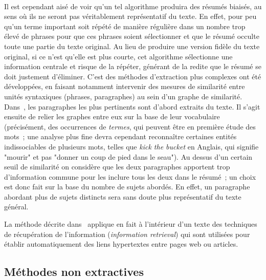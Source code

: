 \documentclass[a4paper, 12pt]{article}
\begin{document}
\paragraph{}
Il est cependant aisé de voir qu'un tel algorithme produira des résumés biaisés, au sens où ils ne seront pas véritablement représentatif du texte. En effet, pour peu qu'un terme important soit répété de manière régulière dans un nombre trop élevé de phrases pour que ces phrases soient sélectionner et que le résumé occulte toute une partie du texte original. Au lieu de produire une version fidèle du texte original, si ce n'est qu'elle est plus courte, cet algorithme sélectionne une information centrale et risque de la répéter, générant de la redite que le résumé se doit justement d'éliminer. C'est des méthodes d'extraction plus complexes ont été développées, en faisant notamment intervenir des mesures de similarité entre unités syntaxiques (phrases, paragraphes) au sein d'un graphe de similarité. Dans~\cite{salton_automatic_1997}, les paragraphes les plus pertinents sont d'abord extraits du texte. Il s'agit ensuite de relier les graphes entre eux sur la base de leur vocabulaire (précisément, des occurrences de \emph{termes}, qui peuvent être en première étude des mots~; une analyse plus fine devra cependant reconnaître certaines entités indissociables de plusieurs mots, telles que \textit{kick the bucket} en Anglais, qui signifie "mourir" et pas "donner un coup de pied dans le seau"). Au dessus d'un certain seuil de similarité on considère que les deux paragraphes apportent trop d'information commune pour les inclure tous les deux dans le résumé~; un choix est donc fait sur la base du nombre de sujets abordés. En effet, un paragraphe abordant plus de sujets distincts sera sans doute plus représentatif du texte général.

La méthode décrite dans~\cite{salton_automatic_1997} applique en fait à l'intérieur d'un texte des techniques de récupération  de l'information (\emph{information retrieval}) qui sont utilisées pour établir automatiquement des liens hypertextes entre pages web ou articles.


\subsection{Méthodes non extractives}
\end{document}
